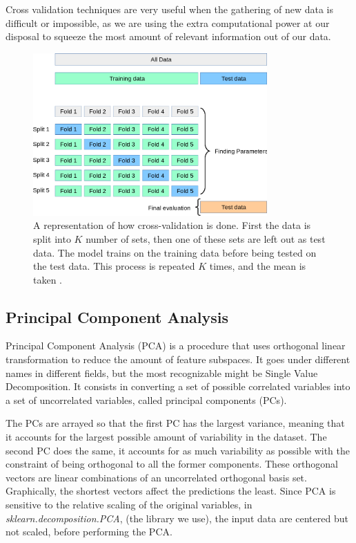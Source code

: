 	Cross validation techniques are very useful when the gathering of new data is difficult or impossible, as we are using the extra computational power at our disposal to squeeze the most amount of relevant information out of our data. 

\begin{figure}[h]
    \centering
    \includegraphics[width=0.8\textwidth]{theory/figures/grid_search_cross_validation.png}
    \caption{A representation of how cross-validation is done. First the data is split into $K$ number of sets, then one of these sets are left out as test data. The model trains on the training data before being tested on the test data. This process is repeated $K$ times, and the mean is taken \cite{fig:cross_validation}.}
    \label{fig:cross-validation}
\end{figure}

\FloatBarrier
\subsection{Principal Component Analysis }\label{sec:PCA}
	Principal Component Analysis (\ac{PCA}) \cite{james2013introduction} is a procedure that uses orthogonal linear transformation to reduce the amount of feature subspaces. It goes under different names in different fields, but the most recognizable might be Single Value Decomposition. It consists in converting a set of possible correlated variables into a set of uncorrelated variables, called principal components (\ac{PC}s). 
	
	The PCs are arrayed so that the first PC has the largest variance, meaning that it accounts for the largest possible amount of variability in the dataset. The second PC does the same, it accounts for as much variability as possible with the constraint of being orthogonal to all the former components. These orthogonal vectors are linear combinations of an uncorrelated orthogonal basis set. Graphically, the shortest vectors affect the predictions the least. Since PCA is sensitive to the relative scaling of the original variables, in \textit{sklearn.decomposition.PCA}, (the library we use), the input data are centered but not scaled, before performing the PCA.
	
